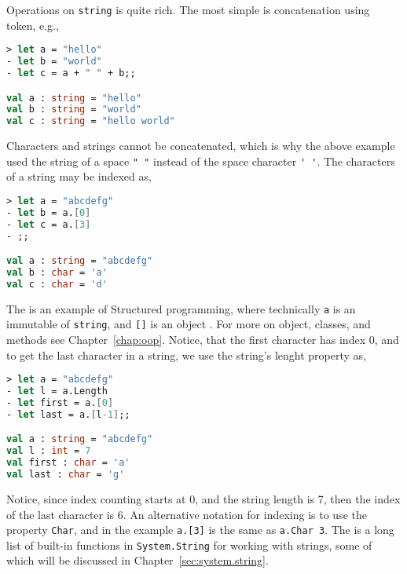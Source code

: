 Operations on \lstinline{string} is quite rich. The most simple is concatenation using \token{+} token, e.g.,
%
\begin{lstlisting}[language=fsharp,caption={fsharpi, example of string concatenation.}]
> let a = "hello"      
- let b = "world"      
- let c = a + " " + b;;

val a : string = "hello"
val b : string = "world"
val c : string = "hello world"
\end{lstlisting}
%
Characters and strings cannot be concatenated, which is why the above example used the string of  a space \lstinline|" "| instead of the space character \lstinline|' '|. The characters of a string may be indexed as,
%
\begin{lstlisting}[language=fsharp,caption={fsharpi, example of string indexing.}]
> let a = "abcdefg"
- let b = a.[0]
- let c = a.[3]
- ;;

val a : string = "abcdefg"
val b : char = 'a'
val c : char = 'd'
\end{lstlisting}
%
The  is an example of Structured programming, where technically \lstinline|a| is an immutable  of  \lstinline|string|, and \lstinline|[]| is an object . For more on object, classes, and methods see Chapter~\ref{chap:oop}.  Notice, that the first character has index 0, and to get the last character in a string, we use the string's lenght property as,
%
\begin{lstlisting}[language=fsharp,caption={fsharpi, string length attribute and string indexing.}]
> let a = "abcdefg"                                                                             
- let l = a.Length                                                       
- let first = a.[0]
- let last = a.[l-1];;

val a : string = "abcdefg"
val l : int = 7
val first : char = 'a'
val last : char = 'g'
\end{lstlisting}
%
Notice, since index counting starts at 0, and the string length is 7, then the index of the last character is 6. An alternative notation for indexing is to use the property \lstinline|Char|, and in the example \lstinline|a.[3]| is the same as \lstinline|a.Char 3|. The is a long list of built-in functions in \lstinline|System.String| for working with strings, some of which will be discussed in Chapter~\ref{sec:system.string}.

